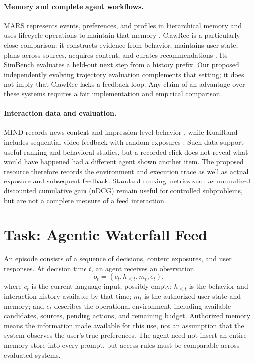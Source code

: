 \documentclass[11pt]{article}
\begin{document}
\paragraph{Memory and complete agent workflows.} MARS represents events, preferences, and profiles in hierarchical memory and uses lifecycle operations to maintain that memory \citep{shen2026mars}. ClawRec is a particularly close comparison: it constructs evidence from behavior, maintains user state, plans across sources, acquires content, and curates recommendations \citep{wu2026clawrec}. Its SimBench evaluates a held-out next step from a history prefix. Our proposed independently evolving trajectory evaluation complements that setting; it does not imply that ClawRec lacks a feedback loop. Any claim of an advantage over these systems requires a fair implementation and empirical comparison.

\paragraph{Interaction data and evaluation.} MIND records news content and impression-level behavior \citep{wu2020mind}, while KuaiRand includes sequential video feedback with random exposures \citep{gao2022kuairand}. Such data support useful ranking and behavioral studies, but a recorded click does not reveal what would have happened had a different agent shown another item. The proposed resource therefore records the environment and execution trace as well as actual exposure and subsequent feedback. Standard ranking metrics such as normalized discounted cumulative gain (nDCG) \citep{jarvelin2002cumulated} remain useful for controlled subproblems, but are not a complete measure of a feed interaction.

\section{Task: Agentic Waterfall Feed}
\label{sec:task}
An episode consists of a sequence of decisions, content exposures, and user responses. At decision time $t$, an agent receives an observation
\begin{equation}
o_t = (c_t, h_{\leq t}, m_t, e_t),
\end{equation}
where $c_t$ is the current language input, possibly empty; $h_{\leq t}$ is the behavior and interaction history available by that time; $m_t$ is the authorized user state and memory; and $e_t$ describes the operational environment, including available candidates, sources, pending actions, and remaining budget. Authorized memory means the information made available for this use, not an assumption that the system observes the user's true preferences. The agent need not insert an entire memory store into every prompt, but access rules must be comparable across evaluated systems.
\end{document}
